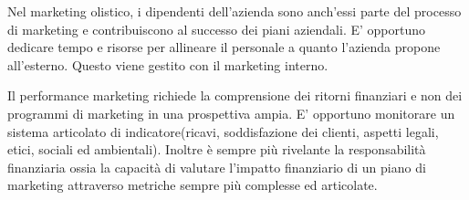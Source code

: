 \documentclass[11pt]{article}
\begin{document}
Nel marketing olistico, i dipendenti dell'azienda sono anch'essi parte del processo di marketing e contribuiscono al successo dei piani aziendali. 
E' opportuno dedicare tempo e risorse per allineare il personale a quanto l'azienda propone all'esterno. Questo viene gestito con il marketing interno.

Il performance marketing richiede la comprensione dei ritorni finanziari e non dei programmi di marketing in una prospettiva ampia. 
E' opportuno monitorare un sistema articolato di indicatore(ricavi, soddisfazione dei clienti, aspetti legali, etici, sociali ed ambientali). 
Inoltre è sempre più rivelante la responsabilità finanziaria ossia la capacità di valutare l'impatto finanziario di un piano di marketing attraverso metriche sempre più complesse ed articolate.
\end{document}
